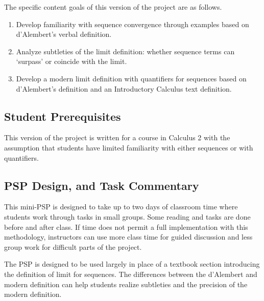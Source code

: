 \documentclass[11pt]{article}%
\begin{document}
\noindent The specific content goals of this version of the project are as follows.



\begin{enumerate}


\item Develop familiarity with sequence convergence through examples based
on d'Alembert's verbal definition.



\item Analyze subtleties of the limit definition: whether sequence terms can
`surpass' or coincide with the limit.


\item Develop a modern limit definition with quantifiers for sequences based
on d'Alembert's definition and an Introductory Calculus text definition.

\end{enumerate}


 \vspace*{-6pt}
\subsection*{Student Prerequisites}
\vspace*{-3pt}

This version of the project is written for a course in Calculus 2 with the assumption that
students have limited familiarity with either sequences or with quantifiers.


 \vspace*{-6pt}
\subsection*{PSP Design, and Task Commentary}
\vspace*{-3pt}

This mini-PSP is designed to take up to two days of classroom time where students
work through tasks in small groups. Some reading and tasks are done before and
after class. If time does not permit a full implementation with this
methodology, instructors can use more class time for guided discussion and
less group work for difficult parts of the project.

The PSP is designed to be used largely in place of a textbook section
introducing the definition of limit for sequences. The differences between the
d'Alembert and modern definition can help students realize subtleties and the
precision of the modern definition.
\end{document}
